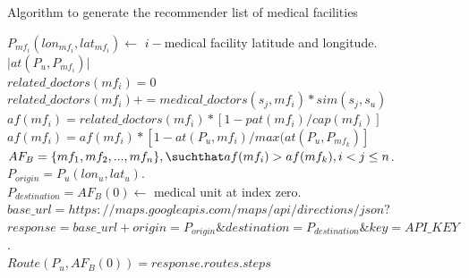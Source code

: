 \documentclass[sustainability,article,submit,pdftex,moreauthors]{Definitions/mdpi}
\begin{document}
\begin{algorithm}
\caption{Algorithm to generate the recommender list of medical facilities}
\label{algorithm_attention_factor}

 {
    $P_{mf_{i}}(lon_{mf_i}, lat_{mf_i}) \gets$  $i-$medical facility latitude and longitude. \\
    $\lvert{at(P_{u}, P_{mf_{i}})}\rvert$ \\
    $related\_doctors(mf_{i})=0$ \\
     {
        $related\_doctors(mf_{i}) += medical\_doctors(s_j, mf_{i}) *  sim(s_j, s_u)$ \\     
	}
    $af(mf_{i}) = related\_doctors(mf_{i})*[1 - pat(mf_{i}) / cap(mf_{i})]$ \\
    $af(mf_{i}) = af(mf_{i}) * [1 - at(P_u, mf_{i}) / max(at(P_u, P_{mf_k})]$
}
$AF_{B} = \{ mf_{1}, mf_{2}, ..., mf_{n} \}, \suchthat  af(mf_{i}) > af(mf_{k}), i<j \leq n$. \\
$P_{origin} = P_{u}(lon_{u}, lat_{u})$. \\
$P_{destination} = AF_{B}(0) \gets $ medical unit at index zero. \\ 
$base\_url = https://maps.googleapis.com/maps/api/directions/json?$
$response = base\_url + origin = P_{origin} \& destination = P_{destination} \& key = API\_KEY $. \\
$Route(P_{u}, AF_{B}(0)) = response.routes.steps$
\BlankLine
\end{algorithm}
\end{document}
